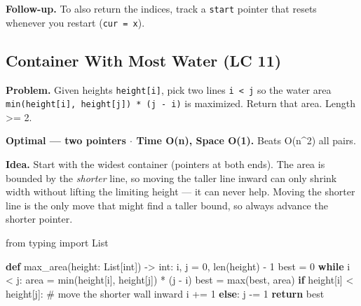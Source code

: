 \documentclass[11pt]{article}
\newenvironment{Shaded}{\begin{snugshade}}{\end{snugshade}}
\newcommand{\BuiltInTok}[1]{\textcolor[rgb]{0.50,0.55,0.55}{#1}}
\newcommand{\CommentTok}[1]{\textcolor[rgb]{0.48,0.49,0.49}{#1}}
\newcommand{\ControlFlowTok}[1]{\textcolor[rgb]{0.99,0.74,0.29}{\textbf{#1}}}
\newcommand{\DecValTok}[1]{\textcolor[rgb]{0.96,0.45,0.00}{#1}}
\newcommand{\ImportTok}[1]{\textcolor[rgb]{0.15,0.68,0.38}{#1}}
\newcommand{\KeywordTok}[1]{\textcolor[rgb]{0.81,0.81,0.76}{\textbf{#1}}}
\newcommand{\NormalTok}[1]{\textcolor[rgb]{0.81,0.81,0.76}{#1}}
\newcommand{\OperatorTok}[1]{\textcolor[rgb]{0.81,0.81,0.76}{#1}}
\begin{document}
\textbf{Follow-up.} To also return the indices, track a \texttt{start} pointer that resets whenever you restart (\texttt{cur\ =\ x}).

\subsection{Container With Most Water (LC 11)}\label{container-with-most-water-lc-11}

\textbf{Problem.} Given heights \texttt{height{[}i{]}}, pick two lines \texttt{i\ \textless{}\ j} so the water area \texttt{min(height{[}i{]},\ height{[}j{]})\ *\ (j\ -\ i)} is maximized. Return that area. Length \textgreater= 2.

\textbf{Optimal --- two pointers \(\cdot\) Time O(n), Space O(1).} Beats O(n\^{}2) all pairs.

\textbf{Idea.} Start with the widest container (pointers at both ends). The area is bounded by the \emph{shorter} line, so moving the taller line inward can only shrink width without lifting the limiting height --- it can never help. Moving the shorter line is the only move that might find a taller bound, so always advance the shorter pointer.


\begin{Shaded}
\begin{Highlighting}[]
\ImportTok{from}\NormalTok{ typing }\ImportTok{import}\NormalTok{ List}

\KeywordTok{def}\NormalTok{ max\_area(height: List[}\BuiltInTok{int}\NormalTok{]) }\OperatorTok{{-}\textgreater{}} \BuiltInTok{int}\NormalTok{:}
\NormalTok{    i, j }\OperatorTok{=} \DecValTok{0}\NormalTok{, }\BuiltInTok{len}\NormalTok{(height) }\OperatorTok{{-}} \DecValTok{1}
\NormalTok{    best }\OperatorTok{=} \DecValTok{0}
    \ControlFlowTok{while}\NormalTok{ i }\OperatorTok{\textless{}}\NormalTok{ j:}
\NormalTok{        area }\OperatorTok{=} \BuiltInTok{min}\NormalTok{(height[i], height[j]) }\OperatorTok{*}\NormalTok{ (j }\OperatorTok{{-}}\NormalTok{ i)}
\NormalTok{        best }\OperatorTok{=} \BuiltInTok{max}\NormalTok{(best, area)}
        \ControlFlowTok{if}\NormalTok{ height[i] }\OperatorTok{\textless{}}\NormalTok{ height[j]:   }\CommentTok{\# move the shorter wall inward}
\NormalTok{            i }\OperatorTok{+=} \DecValTok{1}
        \ControlFlowTok{else}\NormalTok{:}
\NormalTok{            j }\OperatorTok{{-}=} \DecValTok{1}
    \ControlFlowTok{return}\NormalTok{ best}
\end{Highlighting}
\end{Shaded}
\end{document}
